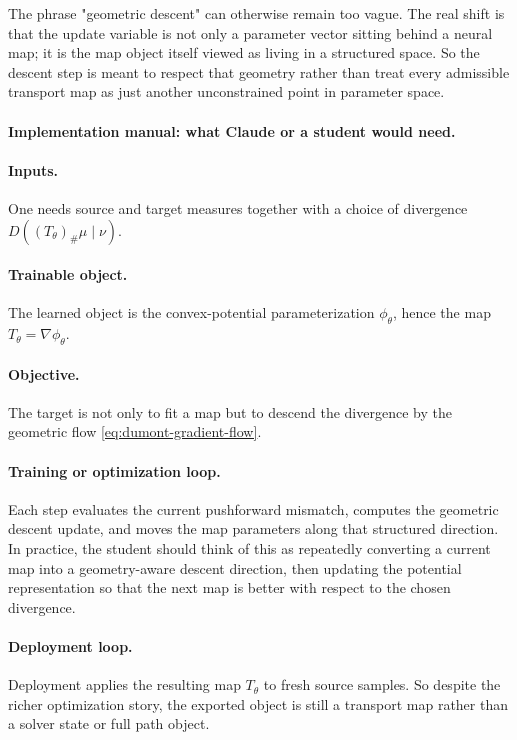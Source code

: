 \documentclass[11pt]{report}
\newcommand{\pushf}[2]{\left(#1\right)_{\#} #2}
\begin{document}
The phrase "geometric descent" can otherwise remain too vague.  The real shift is
that the update variable is not only a parameter vector sitting behind a neural map;
it is the map object itself viewed as living in a structured space.  So the descent
step is meant to respect that geometry rather than treat every admissible transport
map as just another unconstrained point in parameter space.

\paragraph{Implementation manual: what Claude or a student would need.}
\paragraph{Inputs.}
One needs source and target measures together with a choice of divergence
$D(\pushf{T_\theta}{\mu}\mid\nu)$.

\paragraph{Trainable object.}
The learned object is the convex-potential parameterization $\phi_\theta$, hence the
map $T_\theta=\nabla\phi_\theta$.

\paragraph{Objective.}
The target is not only to fit a map but to descend the divergence by the geometric
flow \eqref{eq:dumont-gradient-flow}.

\paragraph{Training or optimization loop.}
Each step evaluates the current pushforward mismatch, computes the geometric descent
update, and moves the map parameters along that structured direction.  In practice,
the student should think of this as repeatedly converting a current map into a
geometry-aware descent direction, then updating the potential representation so that
the next map is better with respect to the chosen divergence.

\paragraph{Deployment loop.}
Deployment applies the resulting map $T_\theta$ to fresh source samples.  So despite
the richer optimization story, the exported object is still a transport map rather
than a solver state or full path object.
\end{document}
